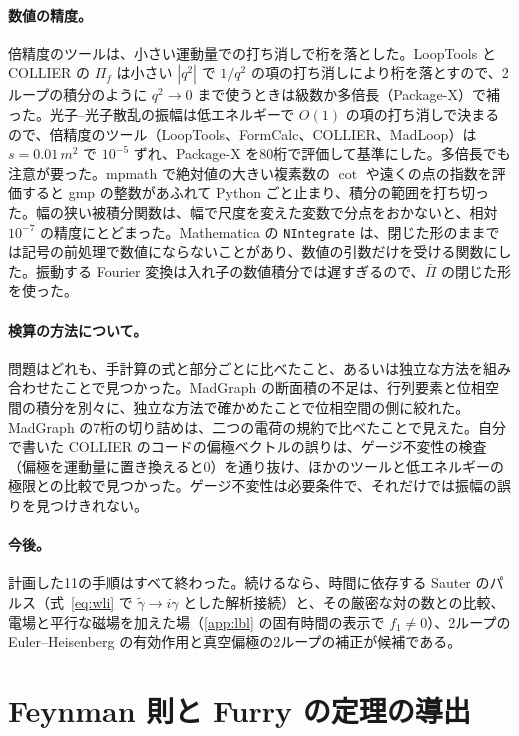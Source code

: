 \documentclass[a4paper,10pt]{ltjsarticle}
\begin{document}
\paragraph{数値の精度。}倍精度のツールは、小さい運動量での打ち消しで桁を落とした。LoopTools と COLLIER の $\Pi_f$ は小さい $|q^2|$ で $1/q^2$ の項の打ち消しにより桁を落とすので、2ループの積分のように $q^2\to0$ まで使うときは級数か多倍長（Package-X）で補った。光子--光子散乱の振幅は低エネルギーで $O(1)$ の項の打ち消しで決まるので、倍精度のツール（LoopTools、FormCalc、COLLIER、MadLoop）は $s=0.01\,m^2$ で $10^{-5}$ ずれ、Package-X を80桁で評価して基準にした。多倍長でも注意が要った。mpmath で絶対値の大きい複素数の $\cot$ や遠くの点の指数を評価すると gmp の整数があふれて Python ごと止まり、積分の範囲を打ち切った。幅の狭い被積分関数は、幅で尺度を変えた変数で分点をおかないと、相対 $10^{-7}$ の精度にとどまった。Mathematica の \texttt{NIntegrate} は、閉じた形のままでは記号の前処理で数値にならないことがあり、数値の引数だけを受ける関数にした。振動する Fourier 変換は入れ子の数値積分では遅すぎるので、$\bar\Pi$ の閉じた形を使った。

\paragraph{検算の方法について。}問題はどれも、手計算の式と部分ごとに比べたこと、あるいは独立な方法を組み合わせたことで見つかった。MadGraph の断面積の不足は、行列要素と位相空間の積分を別々に、独立な方法で確かめたことで位相空間の側に絞れた。MadGraph の7桁の切り詰めは、二つの電荷の規約で比べたことで見えた。自分で書いた COLLIER のコードの偏極ベクトルの誤りは、ゲージ不変性の検査（偏極を運動量に置き換えると0）を通り抜け、ほかのツールと低エネルギーの極限との比較で見つかった。ゲージ不変性は必要条件で、それだけでは振幅の誤りを見つけきれない。

\paragraph{今後。}計画した11の手順はすべて終わった。続けるなら、時間に依存する Sauter のパルス（式~\eqref{eq:wli} で $\tilde\gamma\to i\gamma$ とした解析接続）と、その厳密な対の数との比較、電場と平行な磁場を加えた場（\ref{app:lbl} の固有時間の表示で $f_1\neq0$）、2ループの Euler--Heisenberg の有効作用と真空偏極の2ループの補正が候補である。

\appendix

\section{Feynman 則と Furry の定理の導出}\label{app:rules}
\end{document}

